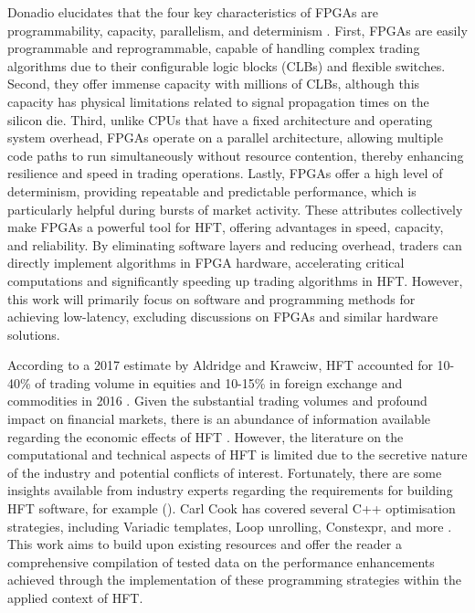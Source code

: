 \documentclass{article}
\theoremstyle{break}
\begin{document}
Donadio elucidates that the four key characteristics of FPGAs are programmability, capacity, parallelism, and determinism \citep{Donadio}. First, FPGAs are easily programmable and reprogrammable, capable of handling complex trading algorithms due to their configurable logic blocks (CLBs) and flexible switches. Second, they offer immense capacity with millions of CLBs, although this capacity has physical limitations related to signal propagation times on the silicon die. Third, unlike CPUs that have a fixed architecture and operating system overhead, FPGAs operate on a parallel architecture, allowing multiple code paths to run simultaneously without resource contention, thereby enhancing resilience and speed in trading operations. Lastly, FPGAs offer a high level of determinism, providing repeatable and predictable performance, which is particularly helpful during bursts of market activity. These attributes collectively make FPGAs a powerful tool for HFT, offering advantages in speed, capacity, and reliability. By eliminating software layers and reducing overhead, traders can directly implement algorithms in FPGA hardware, accelerating critical computations and significantly speeding up trading algorithms in HFT. However, this work will primarily focus on software and programming methods for achieving low-latency, excluding discussions on FPGAs and similar hardware solutions.

According to a 2017 estimate by Aldridge and Krawciw, HFT accounted for 10-40\% of trading volume in equities and 10-15\% in foreign exchange and commodities in 2016 \cite{5}. Given the substantial trading volumes and profound impact on financial markets, there is an abundance of information available regarding the economic effects of HFT \cite{6, 7}. However, the literature on the computational and technical aspects of HFT is limited due to the secretive nature of the industry and potential conflicts of interest. Fortunately, there are some insights available from industry experts regarding the requirements for building HFT software, for example (\cite{8, 9, 10, 12, 16, 17, 18}). Carl Cook has covered several C++ optimisation strategies, including Variadic templates, Loop unrolling, Constexpr, and more \cite{10}. This work aims to build upon existing resources and offer the reader a comprehensive compilation of tested data on the performance enhancements achieved through the implementation of these programming strategies within the applied context of HFT.
\end{document}

